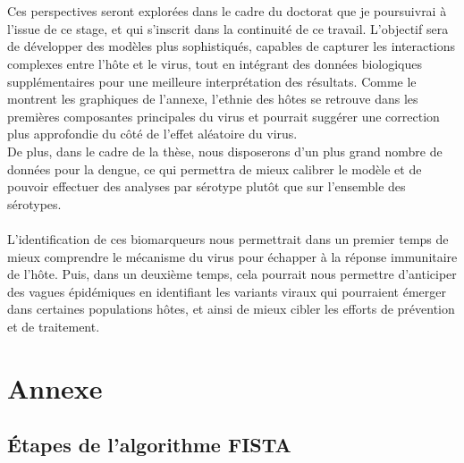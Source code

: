 \documentclass[11pt,a4paper]{article}
\begin{document}
\\
\\
Ces perspectives seront explorées dans le cadre du doctorat que je poursuivrai à l'issue de ce stage, et qui s'inscrit dans la continuité de ce travail. L'objectif sera de développer des modèles plus sophistiqués, capables de capturer les interactions complexes entre l'hôte et le virus, tout en intégrant des données biologiques supplémentaires pour une meilleure interprétation des résultats.
Comme le montrent les graphiques de l'annexe, l'ethnie des hôtes se retrouve dans les premières composantes principales du virus et pourrait suggérer une correction plus approfondie du côté de l'effet aléatoire du virus.
\\
De plus, dans le cadre de la thèse, nous disposerons d'un plus grand nombre de données pour la dengue, ce qui permettra de mieux calibrer le modèle et de pouvoir effectuer des analyses par sérotype plutôt que sur l'ensemble des sérotypes.
\\
\\
L'identification de ces biomarqueurs nous permettrait dans un premier temps de mieux comprendre le mécanisme du virus pour échapper à la réponse immunitaire de l'hôte.
Puis, dans un deuxième temps, cela pourrait nous permettre d'anticiper des vagues épidémiques en identifiant les variants viraux qui pourraient émerger dans certaines populations hôtes, et ainsi de mieux cibler les efforts de prévention et de traitement.


\newpage
\section{Annexe}

\subsection{Étapes de l'algorithme FISTA}
\end{document}

